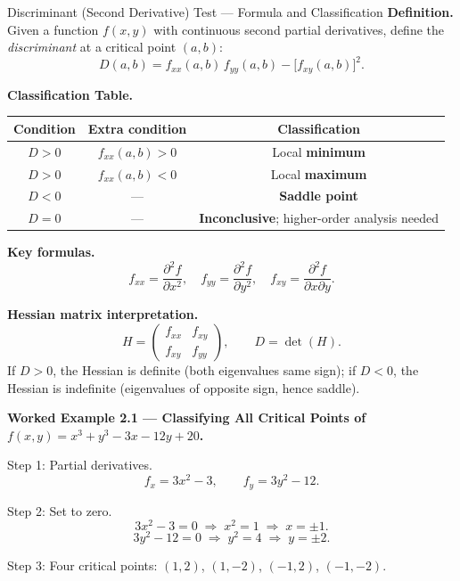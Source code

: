 \documentclass[12pt,a4paper]{article}
\begin{document}
\begin{infobox}{Discriminant (Second Derivative) Test --- Formula and Classification}
\textbf{Definition.} Given a function $f(x,y)$ with continuous second partial derivatives, define the \emph{discriminant} at a critical point $(a,b)$:
\[
  D(a,b) = f_{xx}(a,b)\,f_{yy}(a,b) - \bigl[f_{xy}(a,b)\bigr]^{2}.
\]

\textbf{Classification Table.}

\begin{center}
\begin{tabular}{@{}ccc@{}}
\toprule
\textbf{Condition} & \textbf{Extra condition} & \textbf{Classification} \\
\midrule
$D > 0$ & $f_{xx}(a,b) > 0$ & Local \textbf{minimum} \\
$D > 0$ & $f_{xx}(a,b) < 0$ & Local \textbf{maximum} \\
$D < 0$ & --- & \textbf{Saddle point} \\
$D = 0$ & --- & \textbf{Inconclusive}; higher-order analysis needed \\
\bottomrule
\end{tabular}
\end{center}

\textbf{Key formulas.}
\[
  f_{xx} = \frac{\partial^{2} f}{\partial x^{2}}, \quad
  f_{yy} = \frac{\partial^{2} f}{\partial y^{2}}, \quad
  f_{xy} = \frac{\partial^{2} f}{\partial x \partial y}.
\]

\textbf{Hessian matrix interpretation.}
\[
  H = \begin{pmatrix} f_{xx} & f_{xy} \\ f_{xy} & f_{yy} \end{pmatrix},
  \qquad D = \det(H).
\]
If $D > 0$, the Hessian is definite (both eigenvalues same sign); if $D < 0$, the Hessian is indefinite (eigenvalues of opposite sign, hence saddle).
\end{infobox}

\textbf{Worked Example 2.1 --- Classifying All Critical Points of $f(x,y) = x^{3} + y^{3} - 3x - 12y + 20$.}

Step 1: Partial derivatives.
\[
  f_x = 3x^{2} - 3, \qquad f_y = 3y^{2} - 12.
\]

Step 2: Set to zero.
\[
  3x^{2} - 3 = 0 \;\Rightarrow\; x^{2} = 1 \;\Rightarrow\; x = \pm 1.
\]
\[
  3y^{2} - 12 = 0 \;\Rightarrow\; y^{2} = 4 \;\Rightarrow\; y = \pm 2.
\]

Step 3: Four critical points: $(1,2)$, $(1,-2)$, $(-1,2)$, $(-1,-2)$.
\end{document}
